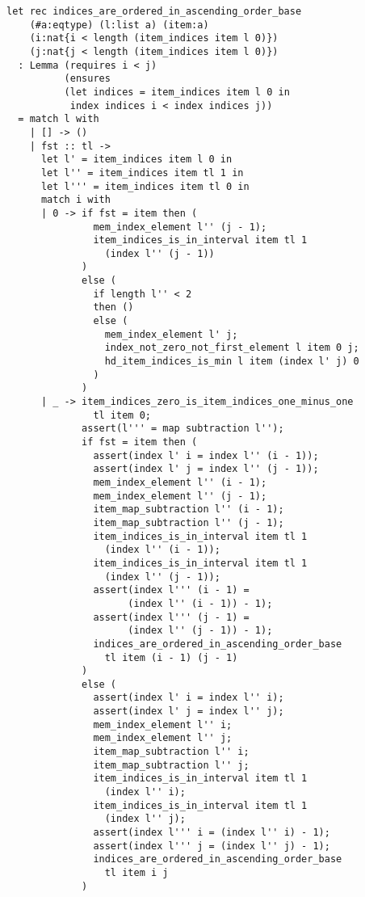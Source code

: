 \begin{verbatim}
let rec indices_are_ordered_in_ascending_order_base 
    (#a:eqtype) (l:list a) (item:a) 
    (i:nat{i < length (item_indices item l 0)}) 
    (j:nat{j < length (item_indices item l 0)})
  : Lemma (requires i < j)
          (ensures
          (let indices = item_indices item l 0 in 
           index indices i < index indices j))
  = match l with
    | [] -> ()
    | fst :: tl -> 
      let l' = item_indices item l 0 in 
      let l'' = item_indices item tl 1 in
      let l''' = item_indices item tl 0 in
      match i with 
      | 0 -> if fst = item then (
               mem_index_element l'' (j - 1);
               item_indices_is_in_interval item tl 1 
                 (index l'' (j - 1))
             )
             else (
               if length l'' < 2
               then ()
               else (
                 mem_index_element l' j;
                 index_not_zero_not_first_element l item 0 j;
                 hd_item_indices_is_min l item (index l' j) 0
               )
             )
      | _ -> item_indices_zero_is_item_indices_one_minus_one
               tl item 0;
             assert(l''' = map subtraction l'');
             if fst = item then (
               assert(index l' i = index l'' (i - 1));
               assert(index l' j = index l'' (j - 1));
               mem_index_element l'' (i - 1);
               mem_index_element l'' (j - 1);
               item_map_subtraction l'' (i - 1);
               item_map_subtraction l'' (j - 1);
               item_indices_is_in_interval item tl 1 
                 (index l'' (i - 1));
               item_indices_is_in_interval item tl 1 
                 (index l'' (j - 1));
               assert(index l''' (i - 1) = 
                     (index l'' (i - 1)) - 1);
               assert(index l''' (j - 1) = 
                     (index l'' (j - 1)) - 1);
               indices_are_ordered_in_ascending_order_base
                 tl item (i - 1) (j - 1)
             )
             else (
               assert(index l' i = index l'' i);
               assert(index l' j = index l'' j);
               mem_index_element l'' i;
               mem_index_element l'' j;
               item_map_subtraction l'' i;
               item_map_subtraction l'' j;
               item_indices_is_in_interval item tl 1 
                 (index l'' i);
               item_indices_is_in_interval item tl 1 
                 (index l'' j);
               assert(index l''' i = (index l'' i) - 1);
               assert(index l''' j = (index l'' j) - 1);
               indices_are_ordered_in_ascending_order_base 
                 tl item i j
             )             
\end{verbatim}

